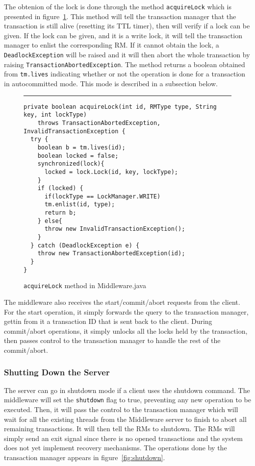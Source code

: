\documentclass[12pt]{article}
\theoremstyle{plain}%
\theoremstyle{definition}
\theoremstyle{remark}
\newcommand{\java}[1]{{\lstinline!#1!}}
\newenvironment{figureone}[1]{%
  \def\deffigurecaption{#1}%
  \begin{figure}[htbp]%
  \begin{center}%
  \begin{minipage}{\columnwidth}%
  \hrule \vspace*{2ex}%
}{%
  \end{minipage}%
  \end{center}%
  \caption{\deffigurecaption}%
  \end{figure}%
}
\begin{document}
The obtenion of the lock is done through the method \java{acquireLock} which is presented in figure~\ref{fig:acquireLock}. This method will tell the transaction manager that the transaction is still alive (resetting its TTL timer), then will verify if a lock can be given. If the lock can be given, and it is a write lock, it will tell the transaction manager to enlist the corresponding RM. If it cannot obtain the lock, a \java{DeadlockException} will be raised and it will then abort the whole transaction by raising \java{TransactionAbortedException}. The method returns a boolean obtained from \java{tm.lives} indicating whether or not the operation is done for a transaction in autocommitted mode. This mode is described in a subsection below.

\begin{figureone}{\java{acquireLock} method in Middleware.java \label{fig:acquireLock}}
\begin{lstlisting}
private boolean acquireLock(int id, RMType type, String key, int lockType) 
    throws TransactionAbortedException, InvalidTransactionException {
  try {
    boolean b = tm.lives(id);
    boolean locked = false;
    synchronized(lock){
      locked = lock.Lock(id, key, lockType);
    }
    if (locked) {
      if(lockType == LockManager.WRITE)
      tm.enlist(id, type);
      return b;
    } else{
      throw new InvalidTransactionException();
    }
  } catch (DeadlockException e) {
    throw new TransactionAbortedException(id);
  }
}
\end{lstlisting}
\end{figureone}

The middleware also receives the start/commit/abort requests from the client. For the start operation, it simply forwards the query to the transaction manager, gettin from it a transaction ID that is sent back to the client. During commit/abort operations, it simply unlocks all the locks held by the transaction, then passes control to the transaction manager to handle the rest of the commit/abort.

\subsubsection*{Shutting Down the Server}

The server can go in shutdown mode if a client uses the shutdown command. The middleware will set the \java{shutdown} flag to true, preventing any new operation to be executed. Then, it will pass the control to the transaction manager which will wait for all the existing threads from the Middleware server to finish to abort all remaining transactions. It will then tell the RMs to shutdown. The RMs will simply send an exit signal since there is no opened transactions and the system does not yet implement recovery mechanisms. The operations done by the transaction manager appears in figure~\ref{fig:shutdown}.
\end{document}
